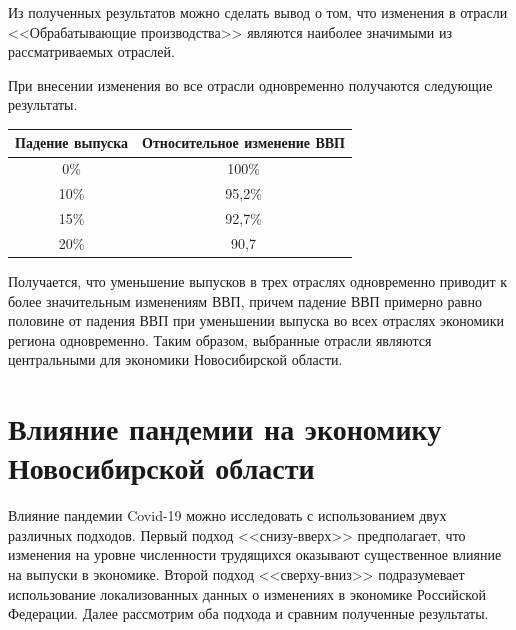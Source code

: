 \documentclass[12pt, a4paper]{article}
\begin{document}
Из полученных результатов можно сделать вывод о том, что изменения в отрасли <<Обрабатывающие производства>> являются наиболее значимыми из рассматриваемых отраслей.

При внесении изменения во все отрасли одновременно получаются следующие результаты.
\begin{center}
\begin{tabular}{|c|c|}
\hline
Падение выпуска & Относительное изменение ВВП\\
\hline
0\% & 100\%\\
10\% & 95,2\%\\
15\% & 92,7\%\\
20\% & 90,7\\
\hline
\end{tabular}
\end{center}

Получается, что уменьшение выпусков в трех отраслях одновременно приводит к более значительным изменениям ВВП, причем падение ВВП примерно равно половине от падения ВВП при уменьшении выпуска во всех отраслях экономики региона одновременно. Таким образом, выбранные отрасли являются центральными для экономики Новосибирской области.

\section{Влияние пандемии на экономику Новосибирской области}

Влияние пандемии Covid-19 можно исследовать с использованием двух различных подходов. Первый подход <<снизу-вверх>> предполагает, что изменения на уровне численности трудящихся оказывают существенное влияние на выпуски в экономике. Второй подход <<сверху-вниз>> подразумевает использование локализованных данных о изменениях в экономике Российской Федерации. Далее рассмотрим оба подхода и сравним полученные результаты.
\end{document}
